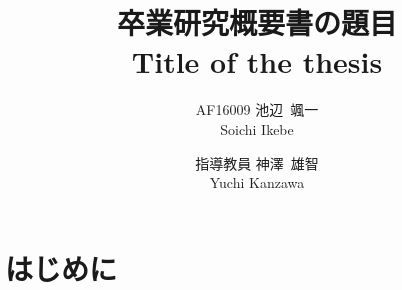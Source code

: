 \documentclass[twocolumn, a4paper]{icethesisabst}
\title{{\bf 卒業研究概要書の題目}
  {\normalsize \\ Title of the thesis}}
\author{
    AF16009 池辺~颯一 \\ Soichi Ikebe \and
    指導教員 神澤~雄智 \\ Yuchi Kanzawa
  }
\begin{document}
\maketitle
\section{はじめに}

\end{document}

